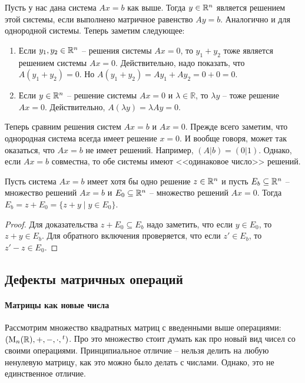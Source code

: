 Пусть у нас дана система $Ax = b$ как выше.
Тогда $y\in\mathbb R^{n}$ является решением этой системы, если выполнено матричное равенство $Ay = b$.
Аналогично и для однородной системы.
Теперь заметим следующее:
\begin{enumerate}
\item Если $y_1, y_2\in \mathbb R^{n}$ -- решения системы $Ax = 0$, то $y_1 + y_2$ тоже является решением системы $Ax = 0$.
Действительно, надо показать, что $A(y_1 + y_2) = 0$.
Но $A(y_1 + y_2) = A y_1 + Ay_2 = 0 + 0 = 0$.

\item Если $y\in\mathbb R^{n}$ -- решение системы $Ax = 0$ и $\lambda\in \mathbb R$, то $\lambda y$ -- тоже решение $Ax = 0$.
Действительно, $A(\lambda y) = \lambda Ay = 0$.
\end{enumerate}

Теперь сравним решения систем $Ax = b$ и $Ax = 0$.
Прежде всего заметим, что однородная система всегда имеет решение $x = 0$.
И вообще говоря, может так оказаться, что $Ax = b$ не имеет решений.
Например, $(A|b) = (0|1)$.
Однако, если $Ax = b$ совместна, то обе системы имеют <<одинаковое число>> решений. 

\begin{claim*}
Пусть система $Ax = b$ имеет хотя бы одно решение $z\in\mathbb R^{n}$ и пусть $E_b\subseteq \mathbb R^{n}$ -- множество решений $Ax = b$ и $E_0\subseteq \mathbb R^{n}$ -- множество решений $Ax = 0$.
Тогда $E_b = z + E_0 = \{z +y\mid y\in E_0\}$.
\end{claim*}
\begin{proof}
Для доказательства $z + E_0 \subseteq E_b$ надо заметить, что если $y\in E_0$, то $z+y\in E_b$.
Для обратного включения проверяется, что если $z'\in E_b$, то $z' - z\in E_0$.
\end{proof}

\subsection{Дефекты матричных операций}

\paragraph{Матрицы как новые числа}

Рассмотрим множество квадратных матриц с введенными выше операциями: $(\operatorname{M}_{n}(\mathbb R), +, -, \cdot, {}^t)$.
Про это множество стоит думать как про новый вид чисел со своими операциями.
Принципиальное отличие -- нельзя делить на любую ненулевую матрицу, как это можно было делать с числами.
Однако, это не единственное отличие.

